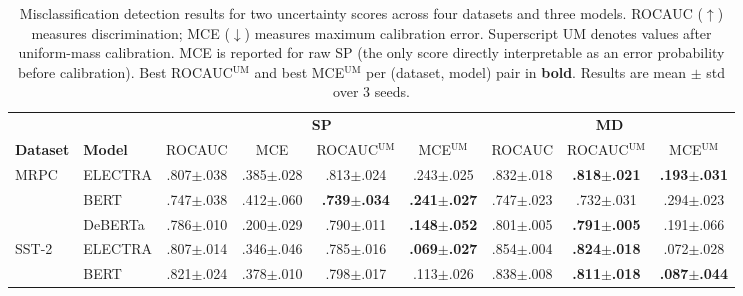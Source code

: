 \begin{table}[t]
\centering
\caption{Misclassification detection results for two uncertainty scores across four datasets and three models.
ROCAUC ($\uparrow$) measures discrimination; MCE ($\downarrow$) measures maximum calibration error.
Superscript UM denotes values after uniform-mass calibration.
MCE is reported for raw SP (the only score directly interpretable as an error probability before calibration).
Best ROCAUC$^{\mathrm{UM}}$ and best MCE$^{\mathrm{UM}}$ per (dataset, model) pair in \textbf{bold}. Results are mean $\pm$ std over 3 seeds.}
\label{tab:main_results}
\small
\begin{tabular}{@{}ll cccc ccc@{}}
\toprule
 & & \multicolumn{4}{c}{\textbf{SP}} & \multicolumn{3}{c}{\textbf{MD}} \\
\cmidrule(lr){3-6} \cmidrule(lr){7-9}
\textbf{Dataset} & \textbf{Model}
& ROCAUC & MCE & ROCAUC$^{\mathrm{UM}}$ & MCE$^{\mathrm{UM}}$
& ROCAUC & ROCAUC$^{\mathrm{UM}}$ & MCE$^{\mathrm{UM}}$ \\
\midrule
MRPC & ELECTRA & .807{\scriptsize$\pm$.038} & .385{\scriptsize$\pm$.028} & .813{\scriptsize$\pm$.024} & .243{\scriptsize$\pm$.025} & .832{\scriptsize$\pm$.018} & \textbf{.818{\scriptsize$\pm$.021}} & \textbf{.193{\scriptsize$\pm$.031}} \\
 & BERT & .747{\scriptsize$\pm$.038} & .412{\scriptsize$\pm$.060} & \textbf{.739{\scriptsize$\pm$.034}} & \textbf{.241{\scriptsize$\pm$.027}} & .747{\scriptsize$\pm$.023} & .732{\scriptsize$\pm$.031} & .294{\scriptsize$\pm$.023} \\
 & DeBERTa & .786{\scriptsize$\pm$.010} & .200{\scriptsize$\pm$.029} & .790{\scriptsize$\pm$.011} & \textbf{.148{\scriptsize$\pm$.052}} & .801{\scriptsize$\pm$.005} & \textbf{.791{\scriptsize$\pm$.005}} & .191{\scriptsize$\pm$.066} \\
\midrule
SST-2 & ELECTRA & .807{\scriptsize$\pm$.014} & .346{\scriptsize$\pm$.046} & .785{\scriptsize$\pm$.016} & \textbf{.069{\scriptsize$\pm$.027}} & .854{\scriptsize$\pm$.004} & \textbf{.824{\scriptsize$\pm$.018}} & .072{\scriptsize$\pm$.028} \\
 & BERT & .821{\scriptsize$\pm$.024} & .378{\scriptsize$\pm$.010} & .798{\scriptsize$\pm$.017} & .113{\scriptsize$\pm$.026} & .838{\scriptsize$\pm$.008} & \textbf{.811{\scriptsize$\pm$.018}} & \textbf{.087{\scriptsize$\pm$.044}} \\

\end{tabular}
\end{table}
